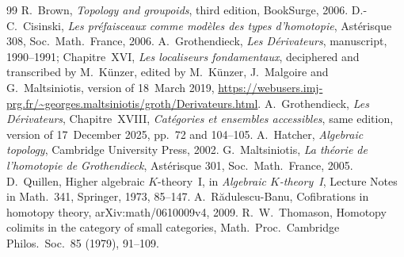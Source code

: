\documentclass[11pt,a4paper]{article}
\theoremstyle{definition}
\begin{document}
\begin{thebibliography}{99}
 R.~Brown, \emph{Topology and groupoids}, third edition, BookSurge, 2006.
 D.-C.~Cisinski, \emph{Les pr\'efaisceaux comme mod\`eles des types
 d'homotopie}, Ast\'erisque 308, Soc.\ Math.\ France, 2006.
 A.~Grothendieck, \emph{Les D\'erivateurs}, manuscript, 1990--1991; Chapitre~XVI,
 \emph{Les localiseurs fondamentaux}, deciphered and transcribed by M.~K\"unzer, edited by
 M.~K\"unzer, J.~Malgoire and G.~Maltsiniotis, version of 18~March 2019,
 \url{https://webusers.imj-prg.fr/~georges.maltsiniotis/groth/Derivateurs.html}.
 A.~Grothendieck, \emph{Les D\'erivateurs}, Chapitre~XVIII, \emph{Cat\'egories
 et ensembles accessibles}, same edition, version of 17~December 2025, pp.~72 and 104--105.
 A.~Hatcher, \emph{Algebraic topology}, Cambridge University Press, 2002.
 G.~Maltsiniotis, \emph{La th\'eorie de l'homotopie de Grothendieck},
 Ast\'erisque 301, Soc.\ Math.\ France, 2005.
 D.~Quillen, Higher algebraic $K$-theory~I, in \emph{Algebraic $K$-theory~I},
 Lecture Notes in Math.\ 341, Springer, 1973, 85--147.
 A.~R\u{a}dulescu-Banu, Cofibrations in homotopy theory, arXiv:math/0610009v4,
 2009.
 R.~W.~Thomason, Homotopy colimits in the category of small categories,
 Math.\ Proc.\ Cambridge Philos.\ Soc.\ 85 (1979), 91--109.
\end{thebibliography}
\end{document}
